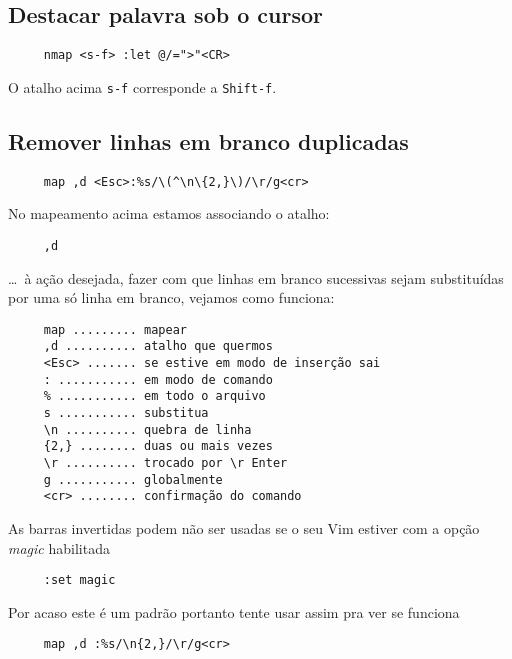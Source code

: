 \subsection{Destacar palavra sob o cursor }
\label{Destacar palavra sob o cursor }

\begin{verbatim}
     nmap <s-f> :let @/=">"<CR>
\end{verbatim}

O atalho acima \verb|s-f| corresponde a \verb|Shift-f|.

\subsection{Remover linhas em branco duplicadas }
\label{Remover linhas em branco duplicadas }

\begin{verbatim}
     map ,d <Esc>:%s/\(^\n\{2,}\)/\r/g<cr>
\end{verbatim}

No mapeamento acima estamos associando o atalho:

\begin{verbatim}
     ,d
\end{verbatim}

\dots~à ação desejada, fazer com que linhas em branco sucessivas sejam
substituídas por uma só linha em branco, vejamos como funciona:

\begin{verbatim}
     map ......... mapear
     ,d .......... atalho que quermos
     <Esc> ....... se estive em modo de inserção sai
     : ........... em modo de comando
     % ........... em todo o arquivo
     s ........... substitua
     \n .......... quebra de linha
     {2,} ........ duas ou mais vezes
     \r .......... trocado por \r Enter
     g ........... globalmente
     <cr> ........ confirmação do comando
\end{verbatim}

As barras invertidas podem não ser usadas se o seu Vim estiver com a opção
{\em magic} habilitada

\begin{verbatim}
     :set magic
\end{verbatim}

Por acaso este é um padrão portanto tente usar assim pra ver se funciona

\begin{verbatim}
     map ,d :%s/\n{2,}/\r/g<cr>
\end{verbatim}


